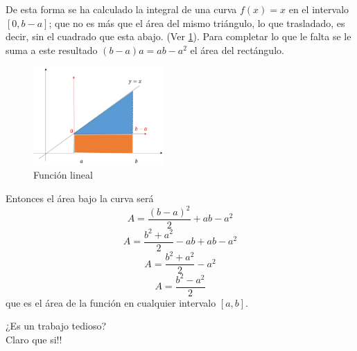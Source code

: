 \documentclass[10pt,twoside]{SelfArx} %
\begin{document}
\begin{ejemplo}
\begin{equation}
\end{equation}
De esta forma se ha calculado la integral de una curva $ f(x)=x $ en  el intervalo $ [0,b-a] $; que no es más que el área del mismo triángulo, lo que trasladado, es decir, sin el cuadrado que esta abajo. (Ver \ref{integracion6}). Para completar lo que le falta se le suma a este resultado $ (b-a)a=ab-a^{2} $ el área del rectángulo.
    \begin{figure}[h]
    	\centering
    	\includegraphics[width=5cm]{integracion6}
    	\caption{Función lineal}
    	\label{integracion6}
    \end{figure}
 Entonces el área bajo la curva será 
 \begin{equation}
 A=\dfrac{(b-a)^{2}}{2}+ab-a^{2}
 \end{equation} 
 \begin{equation}
 A=\dfrac{b^{2}+a^{2}}{2}-ab+ab-a^{2}
 \end{equation}   
\begin{equation}
 A=\dfrac{b^{2}+a^{2}}{2}-a^{2}
\end{equation}    
\begin{equation}
 A=\dfrac{b^{2}-a^{2}}{2}
\end{equation}
que es el área de la función en cualquier intervalo $ [a,b] $.\\

\end{ejemplo}
¿Es un trabajo tedioso? \\
Claro que si!!\\
\end{document}
